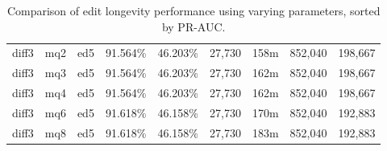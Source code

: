 \begin{sidewaystable}[!tp]
\begin{center}
\begin{tabular}{|c|c|c||c|c||c|c|c|c|}
diff3 & mq2 & ed5 & 91.564\% & 46.203\% & 27,730 & 158m & 852,040 & 198,667 \\
diff3 & mq3 & ed5 & 91.564\% & 46.203\% & 27,730 & 162m & 852,040 & 198,667 \\
diff3 & mq4 & ed5 & 91.564\% & 46.203\% & 27,730 & 162m & 852,040 & 198,667 \\
diff3 & mq6 & ed5 & 91.618\% & 46.158\% & 27,730 & 170m & 852,040 & 192,883 \\
diff3 & mq8 & ed5 & 91.618\% & 46.158\% & 27,730 & 183m & 852,040 & 192,883 \\
\hline
\end{tabular}
\end{center}
\caption{Comparison of edit longevity performance using
    varying parameters, sorted by PR-AUC.}
\label{tab:editshout}
\end{sidewaystable}
